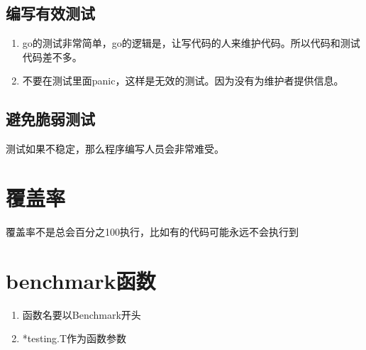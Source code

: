 \hypertarget{ux7f16ux5199ux6709ux6548ux6d4bux8bd5}{%
\subsection{编写有效测试}\label{ux7f16ux5199ux6709ux6548ux6d4bux8bd5}}

\begin{enumerate}
\tightlist
\item
  go的测试非常简单，go的逻辑是，让写代码的人来维护代码。所以代码和测试代码差不多。
\item
  不要在测试里面panic，这样是无效的测试。因为没有为维护者提供信息。
\end{enumerate}

\hypertarget{ux907fux514dux8106ux5f31ux6d4bux8bd5}{%
\subsection{避免脆弱测试}\label{ux907fux514dux8106ux5f31ux6d4bux8bd5}}

测试如果不稳定，那么程序编写人员会非常难受。

\hypertarget{ux8986ux76d6ux7387}{%
\section{覆盖率}\label{ux8986ux76d6ux7387}}

\begin{Shaded}
\begin{Highlighting}[]
\end{Highlighting}
\end{Shaded}

覆盖率不是总会百分之100执行，比如有的代码可能永远不会执行到

\hypertarget{benchmarkux51fdux6570}{%
\section{benchmark函数}\label{benchmarkux51fdux6570}}

\begin{enumerate}
\tightlist
\item
  函数名要以Benchmark开头
\item
  *testing.T作为函数参数
\end{enumerate}

